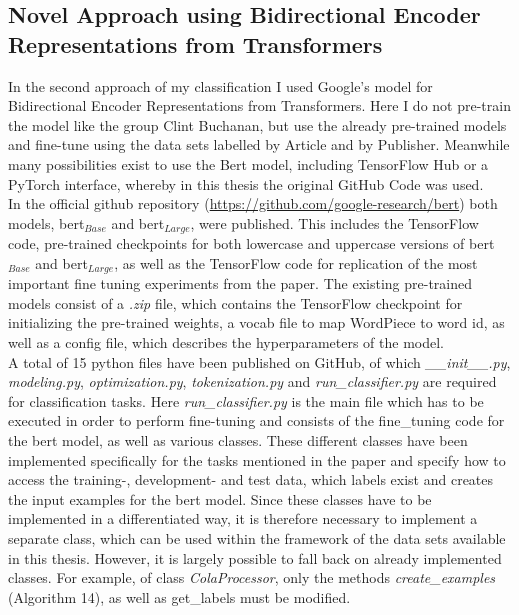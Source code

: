 \documentclass[a4paper, 11pt,titlepage,oneside,openany]{book}
\begin{document}
\subsection{Novel Approach using Bidirectional Encoder Representations from Transformers}
In the second approach of my classification I used Google's model for Bidirectional Encoder Representations from Transformers. Here I do not pre-train the model like the group Clint Buchanan, but use the already pre-trained models and fine-tune using the data sets labelled by Article and by Publisher. Meanwhile many possibilities exist to use the Bert model, including TensorFlow Hub or a PyTorch \cite{pytorch} interface, whereby in this thesis the original GitHub Code was used.\\
\indent In the official github repository (\url{https://github.com/google-research/bert}) both models, \gls{bert}$_{Base}$ and \gls{bert}$_{Large}$, were published. This includes the TensorFlow \cite{tensorflow} code, pre-trained checkpoints for both lowercase and uppercase versions of \gls{bert}$_{Base}$ and \gls{bert}$_{Large}$, as well as the TensorFlow code for replication of the most important fine tuning experiments from the paper. The existing pre-trained models consist of a \textit{.zip} file, which contains the TensorFlow checkpoint for initializing the pre-trained weights, a vocab file to map WordPiece to word id, as well as a config file, which describes the hyperparameters of the model. \\ 
\indent A total of 15 python files have been published on GitHub, of which \textit{\_\_init\_\_.py}, \textit{modeling.py}, \textit{optimization.py}, \textit{tokenization.py} and \textit{run\_classifier.py} are required for classification tasks. Here \textit{run\_classifier.py} is the main file which has to be executed in order to perform fine-tuning and consists of the fine\_tuning code for the \gls{bert} model, as well as various classes. These different classes have been implemented specifically for the tasks mentioned in the paper and specify how to access the training-, development- and test data, which labels exist and creates the input examples for the \gls{bert} model. Since these classes have to be implemented in a differentiated way, it is therefore necessary to implement a separate class, which can be used within the framework of the data sets available in this thesis. However, it is largely possible to fall back on already implemented classes. For example, of class \textit{ColaProcessor}, only the methods \textit{ create\_examples} (Algorithm 14), as well as get\_labels must be modified. \\
\end{document}
